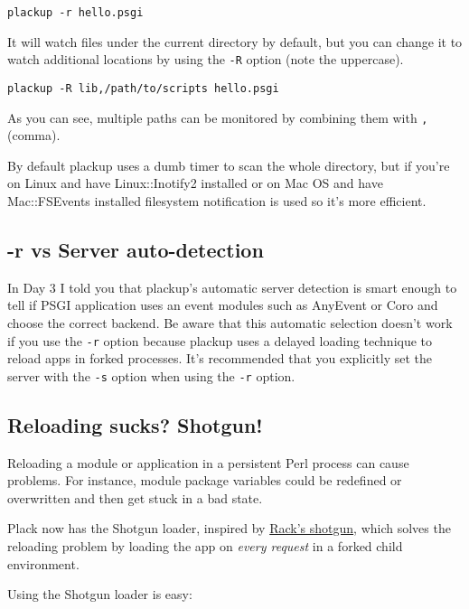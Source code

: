 \begin{lstlisting}
plackup -r hello.psgi
\end{lstlisting}

It will watch files under the current directory by default, but you can
change it to watch additional locations by using the \lstinline!-R!
option (note the uppercase).

\begin{lstlisting}
plackup -R lib,/path/to/scripts hello.psgi
\end{lstlisting}

As you can see, multiple paths can be monitored by combining them with
\lstinline!,! (comma).

By default plackup uses a dumb timer to scan the whole directory, but if
you're on Linux and have Linux::Inotify2 installed or on Mac OS and have
Mac::FSEvents installed filesystem notification is used so it's more
efficient.

\subsection{-r vs Server
auto-detection}\label{r-vs-server-auto-detection}

In Day 3 I told you that plackup's automatic server detection is smart
enough to tell if PSGI application uses an event modules such as
AnyEvent or Coro and choose the correct backend. Be aware that this
automatic selection doesn't work if you use the \lstinline!-r! option
because plackup uses a delayed loading technique to reload apps in
forked processes. It's recommended that you explicitly set the server
with the \lstinline!-s! option when using the \lstinline!-r! option.

\subsection{Reloading sucks? Shotgun!}\label{reloading-sucks-shotgun}

Reloading a module or application in a persistent Perl process can cause
problems. For instance, module package variables could be redefined or
overwritten and then get stuck in a bad state.

Plack now has the Shotgun loader, inspired by
\href{http://github.com/rtomayko/shotgun}{Rack's shotgun}, which solves
the reloading problem by loading the app on \emph{every request} in a
forked child environment.

Using the Shotgun loader is easy:

